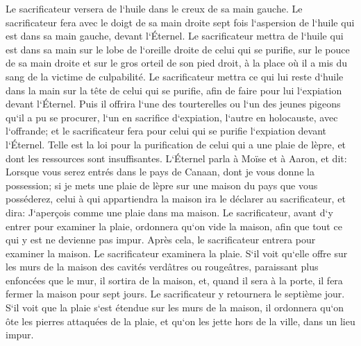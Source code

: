 \verse Le sacrificateur versera de l`huile dans le creux de sa main gauche. 
\verse Le sacrificateur fera avec le doigt de sa main droite sept fois l`aspersion de l`huile qui est dans sa main gauche, devant l`Éternel. 
\verse Le sacrificateur mettra de l`huile qui est dans sa main sur le lobe de l`oreille droite de celui qui se purifie, sur le pouce de sa main droite et sur le gros orteil de son pied droit, à la place où il a mis du sang de la victime de culpabilité. 
\verse Le sacrificateur mettra ce qui lui reste d`huile dans la main sur la tête de celui qui se purifie, afin de faire pour lui l`expiation devant l`Éternel. 
\verse Puis il offrira l`une des tourterelles ou l`un des jeunes pigeons qu`il a pu se procurer, 
\verse l`un en sacrifice d`expiation, l`autre en holocauste, avec l`offrande; et le sacrificateur fera pour celui qui se purifie l`expiation devant l`Éternel. 
\verse Telle est la loi pour la purification de celui qui a une plaie de lèpre, et dont les ressources sont insuffisantes. 
\verse L`Éternel parla à Moïse et à Aaron, et dit: 
\verse Lorsque vous serez entrés dans le pays de Canaan, dont je vous donne la possession; si je mets une plaie de lèpre sur une maison du pays que vous posséderez, 
\verse celui à qui appartiendra la maison ira le déclarer au sacrificateur, et dira: J`aperçois comme une plaie dans ma maison. 
\verse Le sacrificateur, avant d`y entrer pour examiner la plaie, ordonnera qu`on vide la maison, afin que tout ce qui y est ne devienne pas impur. Après cela, le sacrificateur entrera pour examiner la maison. 
\verse Le sacrificateur examinera la plaie. S`il voit qu`elle offre sur les murs de la maison des cavités verdâtres ou rougeâtres, paraissant plus enfoncées que le mur, 
\verse il sortira de la maison, et, quand il sera à la porte, il fera fermer la maison pour sept jours. 
\verse Le sacrificateur y retournera le septième jour. S`il voit que la plaie s`est étendue sur les murs de la maison, 
\verse il ordonnera qu`on ôte les pierres attaquées de la plaie, et qu`on les jette hors de la ville, dans un lieu impur. 
